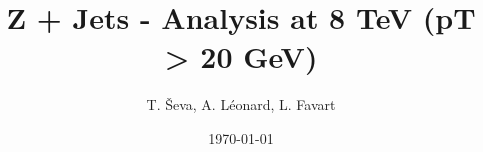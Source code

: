 \documentclass[10pt]{beamer}
\title[Z+Jets at 8 TeV]{\textbf{Z + Jets - Analysis at 8 TeV (pT > 20 GeV)}}
\author[A. Léonard]{T. \v{S}eva, A. Léonard, L. Favart}
\institute{IIHE}
\date{\today}
\begin{document}
\begin{frame}
\titlepage
\end{frame}


%
%
%
%
%
%
%
%
%
%
%
%
%
%
%
%
%
%
%
%
%
%
\end{document}
